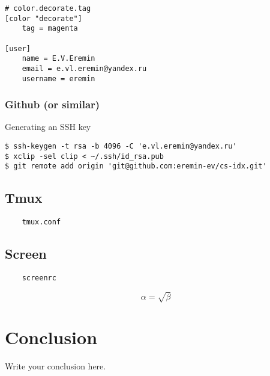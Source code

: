 \documentclass{article}
\begin{document}
\begin{verbatim}
# color.decorate.tag
[color "decorate"]
	tag = magenta

[user]
	name = E.V.Eremin
	email = e.vl.eremin@yandex.ru
	username = eremin
\end{verbatim}

\subsubsection{Github (or similar)}

Generating an SSH key

\begin{verbatim}
$ ssh-keygen -t rsa -b 4096 -C 'e.vl.eremin@yandex.ru'
$ xclip -sel clip < ~/.ssh/id_rsa.pub
$ git remote add origin 'git@github.com:eremin-ev/cs-idx.git'
\end{verbatim}

\subsection{Tmux}

\begin{verbatim}
	tmux.conf
\end{verbatim}

\subsection{Screen}

\begin{verbatim}
	screenrc
\end{verbatim}

\begin{equation}
    \label{simple_equation}
    \alpha = \sqrt{\beta}
\end{equation}

\section{Conclusion}

Write your conclusion here.
\end{document}
